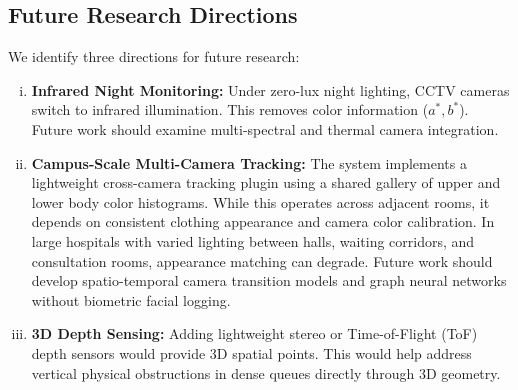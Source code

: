 \subsection{Future Research Directions}
We identify three directions for future research:
\begin{enumerate}[(i)]
    \item \textbf{Infrared Night Monitoring:} Under zero-lux night lighting, CCTV cameras switch to infrared illumination. This removes color information ($a^*, b^*$). Future work should examine multi-spectral and thermal camera integration.
    \item \textbf{Campus-Scale Multi-Camera Tracking:} The system implements a lightweight cross-camera tracking plugin using a shared gallery of upper and lower body color histograms. While this operates across adjacent rooms, it depends on consistent clothing appearance and camera color calibration. In large hospitals with varied lighting between halls, waiting corridors, and consultation rooms, appearance matching can degrade. Future work should develop spatio-temporal camera transition models and graph neural networks without biometric facial logging.
    \item \textbf{3D Depth Sensing:} Adding lightweight stereo or Time-of-Flight (ToF) depth sensors would provide 3D spatial points. This would help address vertical physical obstructions in dense queues directly through 3D geometry.
\end{enumerate}
